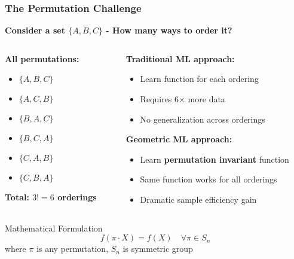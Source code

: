 \begin{frame}[fragile]\frametitle{The Permutation Challenge}

\begin{center}
\textbf{Consider a set $\{A, B, C\}$ - How many ways to order it?}
\end{center}

\begin{columns}
\begin{column}{0.35\textwidth}
\textbf{All permutations:}
\begin{itemize}
\item $\{A, B, C\}$
\item $\{A, C, B\}$  
\item $\{B, A, C\}$
\item $\{B, C, A\}$
\item $\{C, A, B\}$
\item $\{C, B, A\}$
\end{itemize}

\textbf{Total: $3! = 6$ orderings}
\end{column}
\begin{column}{0.65\textwidth}
\textbf{Traditional ML approach:}
\begin{itemize}
\item Learn function for each ordering
\item Requires 6× more data
\item No generalization across orderings
\end{itemize}

\vspace{0.2cm}
\textbf{Geometric ML approach:}
\begin{itemize}
\item Learn \textbf{permutation invariant} function
\item Same function works for all orderings
\item Dramatic sample efficiency gain
\end{itemize}
\end{column}
\end{columns}

\begin{block}{Mathematical Formulation}
$$f(\pi \cdot X) = f(X) \quad \forall \pi \in S_n$$
where $\pi$ is any permutation, $S_n$ is symmetric group
\end{block}

\end{frame}

